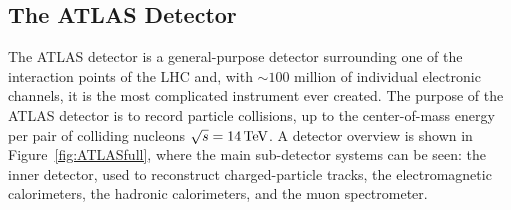 \subsection{The ATLAS Detector}

The ATLAS detector \cite{ATLAS} is a general-purpose detector surrounding one of
the interaction points of the LHC and, with $\sim 100$ million of individual
electronic channels, it is the most complicated instrument ever created.
The purpose of the ATLAS detector is to record particle collisions, up to the center-of-mass
energy per pair of colliding nucleons $\sqrt{s} = 14 \,\text{TeV}$. A detector overview is
shown in Figure~\ref{fig:ATLASfull}, where the main sub-detector systems can be
seen: the inner detector, used to reconstruct charged-particle tracks, the
electromagnetic calorimeters, the hadronic calorimeters, and the muon
spectrometer. 

